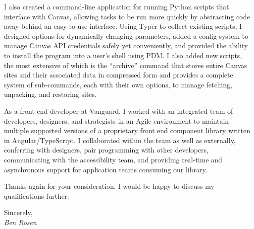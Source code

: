 \documentclass{letter}
\begin{document}
I also created a command-line application for running Python scripts that
interface with Canvas, allowing tasks to be run more quickly by abstracting code
away behind an easy-to-use interface. Using Typer to collect existing scripts, I
designed options for dynamically changing parameters, added a config system to
manage Canvas API credentials safely yet conveniently, and provided the ability
to install the program into a user’s shell using PDM. I also added new scripts,
the most extensive of which is the “archive” command that stores entire Canvas
sites and their associated data in compressed form and provides a complete
system of sub-commands, each with their own options, to manage fetching,
unpacking, and restoring sites.

As a front end developer at Vanguard, I worked with an integrated team of
developers, designers, and strategists in an Agile environment to maintain
multiple supported versions of a proprietary front end component library written
in Angular/TypeScript. I collaborated within the team as well as externally,
conferring with designers, pair programming with other developers, communicating
with the accessibility team, and providing real-time and asynchronous support
for application teams consuming our library.

Thanks again for your consideration. I would be happy to discuss my
qualifications further.

Sincerely, \\
\emph{Ben Rosen}
\end{document}
